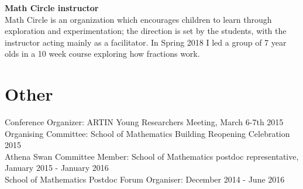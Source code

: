 \documentclass[margin]{res} %
\begin{document}
\begin{resume}
{\bf Math Circle instructor}\\
Math Circle is an organization which encourages children to learn through exploration and experimentation; the direction is set by the students, with the instructor acting mainly as a facilitator. In Spring 2018 I led a group of 7 year olds in a 10 week course exploring how fractions work.

\section{\sc Other}
Conference Organizer: ARTIN Young Researchers Meeting, March 6-7th 2015\\[0.5em]
Organising Committee: School of Mathematics Building Reopening Celebration 2015\\[0.5em]
Athena Swan Committee Member: School of Mathematics postdoc representative, January 2015 - January 2016 \\[0.5em]
School of Mathematics Postdoc Forum Organiser: December 2014 - June 2016











\end{resume}
\end{document}
